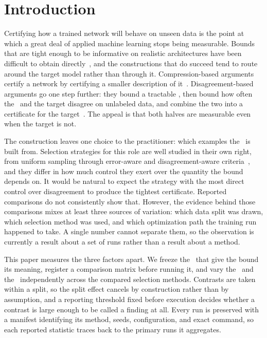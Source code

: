 \section{Introduction}
\label{sec:introduction}

Certifying how a trained network will behave on unseen data is the point at
which a great deal of applied machine learning stops being measurable. Bounds
that are tight enough to be informative on realistic architectures have been
difficult to obtain directly~\cite{livni2020limitation, hellstrm2023generalization},
and the constructions that do succeed tend to route around the target model
rather than through it. Compression-based arguments certify a network by
certifying a smaller description of it~\cite{arora2018stronger, zhou2018nonvacuous,
shin2021compressing, bazinet2024sample}. Disagreement-based arguments go one
step further: they bound a tractable \surrogate, then bound how often the
\surrogate\ and the target disagree on unlabeled data, and combine the two into
a certificate for the target~\cite{jiang2021assessing, kirsch2022assessing}.
The appeal is that both halves are measurable even when the target is not.

The construction leaves one choice to the practitioner: which examples the
\surrogate\ is built from. Selection strategies for this role are well studied
in their own right, from uniform sampling through error-aware and
disagreement-aware criteria~\cite{coleman2019selection, xia2023refined,
benkert2024effective, feng2024tarot}, and they differ in how much control they
exert over the quantity the bound depends on. It would be natural to expect the
strategy with the most direct control over disagreement to produce the tightest
certificate. Reported comparisons do not consistently show that. However, the
evidence behind those comparisons mixes at least three sources of variation:
which data split was drawn, which selection method was used, and which
optimization path the training run happened to take. A single number cannot
separate them, so the observation is currently a result about a set of runs
rather than a result about a method.

This paper measures the three factors apart. We freeze the \evalsem\ that give
the bound its meaning, register a comparison matrix before running it, and vary
the \splitseed\ and the \trajseed\ independently across the compared selection
methods. Contrasts are taken within a split, so the split effect cancels by
construction rather than by assumption, and a reporting threshold fixed before
execution decides whether a contrast is large enough to be called a finding at
all. Every run is preserved with a manifest identifying its method, seeds,
configuration, and exact command, so each reported statistic traces back to the
primary runs it aggregates.

